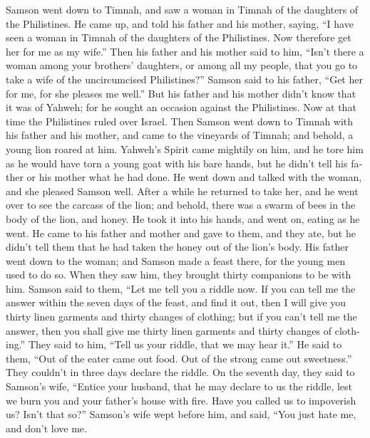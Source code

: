 \begin{paracol}{2}
\begin{otherlanguage}{english}
 Samson went down to Timnah, and saw a woman in Timnah of
the daughters of the Philistines.  He came up, and told
his father and his mother, saying, ``I have seen a woman in Timnah of
the daughters of the Philistines. Now therefore get her for me as my
wife.''  Then his father and his mother said to him,
``Isn't there a woman among your brothers' daughters, or among all my
people, that you go to take a wife of the uncircumcised Philistines?''
Samson said to his father, ``Get her for me, for she pleases me well.''
 But his father and his mother didn't know that it was of
Yahweh; for he sought an occasion against the Philistines. Now at that
time the Philistines ruled over Israel.  Then Samson went
down to Timnah with his father and his mother, and came to the vineyards
of Timnah; and behold, a young lion roared at him. 
Yahweh's Spirit came mightily on him, and he tore him as he would have
torn a young goat with his bare hands, but he didn't tell his father or
his mother what he had done.  He went down and talked with
the woman, and she pleased Samson well.  After a while he
returned to take her, and he went over to see the carcass of the lion;
and behold, there was a swarm of bees in the body of the lion, and
honey.  He took it into his hands, and went on, eating as
he went. He came to his father and mother and gave to them, and they
ate, but he didn't tell them that he had taken the honey out of the
lion's body.  His father went down to the woman; and
Samson made a feast there, for the young men used to do so.
 When they saw him, they brought thirty companions to be
with him.  Samson said to them, ``Let me tell you a
riddle now. If you can tell me the answer within the seven days of the
feast, and find it out, then I will give you thirty linen garments and
thirty changes of clothing;  but if you can't tell me the
answer, then you shall give me thirty linen garments and thirty changes
of clothing.'' They said to him, ``Tell us your riddle, that we may hear
it.''  He said to them, ``Out of the eater came out food.
Out of the strong came out sweetness.'' They couldn't in three days
declare the riddle.  On the seventh day, they said to
Samson's wife, ``Entice your husband, that he may declare to us the
riddle, lest we burn you and your father's house with fire. Have you
called us to impoverish us? Isn't that so?''  Samson's
wife wept before him, and said, ``You just hate me, and don't love me.

\end{otherlanguage}
\end{paracol}
